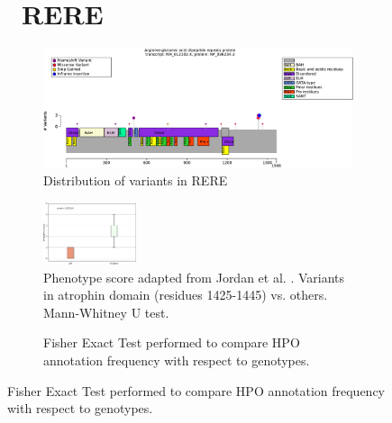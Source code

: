 \begin{figure}[htbp]
\section*{ RERE}
\centering
\begin{subfigure}[b]{0.95\textwidth}
\centering
\includegraphics[width=\textwidth]{ img/RERE_protein_diagram.pdf} 
\captionsetup{justification=raggedright,singlelinecheck=false}
\caption{Distribution of variants in RERE}
\end{subfigure}

\vspace{2em}

\begin{subfigure}[b]{0.95\textwidth}
\centering
\includegraphics[width=0.3\textwidth]{ img/RERE_stats.pdf} 
\captionsetup{justification=raggedright,singlelinecheck=false}
\caption{Phenotype score adapted from Jordan et al. \cite{PMID_29330883}. Variants in atrophin domain (residues 1425-1445) vs. others. Mann-Whitney U test.}
\end{subfigure}

\vspace{2em}

\begin{subfigure}[b]{0.95\textwidth}
\centering
{}
\captionsetup{justification=raggedright,singlelinecheck=false}
\caption{Fisher Exact Test performed to compare HPO annotation frequency with respect to genotypes. }
\end{subfigure}


\end{figure}
